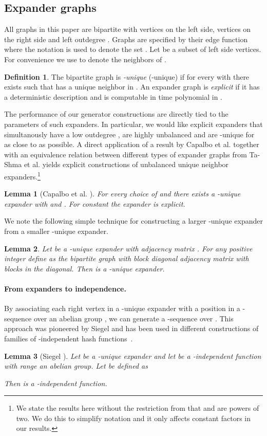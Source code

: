 \documentclass[a4paper,11pt]{article}
\theoremstyle{plain}
\newtheorem{lemma}{Lemma}
\theoremstyle{definition}
\newtheorem{definition}{Definition}
\begin{document}
\subsection{Expander graphs}
All graphs in this paper are bipartite with  vertices on the left side,  vertices on the right side and left outdegree .
Graphs are specified by their edge function  where the notation  is used to denote the set .
Let  be a subset of left side vertices. 
For convenience we use  to denote the neighbors of . 
\begin{definition}
The bipartite graph  is \mbox{\emph{-unique}} (-unique) 
if for every  with  there exists  such that  has a unique neighbor in . 
An expander graph is \emph{explicit} if it has a deterministic description and  is computable in time polynomial in . 
\end{definition}
The performance of our generator constructions are directly tied to the parameters of such expanders. 
In particular, we would like explicit expanders that simultanously have a low outdegree , are highly unbalanced and are -unique for  as close to  as possible.
A direct application of a result by Capalbo et al. \cite[Theorem 7.1]{capalbo2002} together with an equivalence relation between different types of expander graphs from Ta-Shma et al. \cite[Theorem 8.1]{tashma2007} yields explicit constructions of unbalanced unique neighbor expanders.\footnote{We state the results here without the restriction from \cite{capalbo2002} that  and  are powers of two. We do this to simplify notation and it only affects constant factors in our results.}  
\begin{lemma}[Capalbo et al. {\cite[Theorem 7.1]{capalbo2002}}] \label{lem:explicit}
For every choice of  and  there exists a -unique expander with  and . For constant  the expander is explicit. 
\end{lemma}
We note the following simple technique for constructing a larger -unique expander from a smaller -unique expander.
\begin{lemma} \label{lem:stacking}
Let  be a -unique expander with  adjacency matrix .
For any positive integer  define  as the bipartite graph with block diagonal adjacency matrix  with  blocks in the diagonal.
Then  is a -unique expander.
\end{lemma}

\paragraph{From expanders to independence.}
By associating each right vertex in a -unique expander with a position in a -sequence over an abelian group , we can generate a -sequence over .
This approach was pioneered by Siegel and has been used in different constructions of families of -independent hash functions~\cite{siegel2004, thorup2013}.    
\begin{lemma}[Siegel {\cite[Lemma 2.6, Corollary 2.11]{siegel2004}}] \label{lem:expanderhashing}
Let  be a -unique expander and let  be a -independent function with range an abelian group. 
Let  be defined as  

Then  is a -independent function.
\end{lemma}
\end{document}
